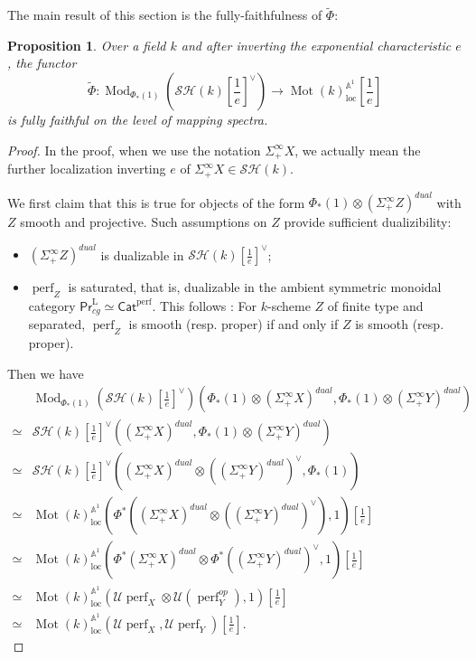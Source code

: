 \documentclass{article}
\newtheorem{prop}[thm]{Proposition}
\theoremstyle{definition}
\newcommand{\on}{\operatorname}
\newcommand{\PrL}{\mathsf{Pr}^\mathrm{L} }
\begin{document}
The main result of this section is the fully-faithfulness of $\widetilde{\Phi}$:
\begin{prop}\label{comparison.SH}
Over a field $k$ and after inverting the exponential characteristic $e$, the functor\[
\widetilde{\Phi}:\on{Mod}_{\Phi_\ast(1)}(\mathcal{SH}(k)[\frac{1}{e}]^\vee)\rightarrow\on{Mot}(k)^{\mathbb{A}^1}_{\on{loc}}[\frac{1}{e}]
\]
is fully faithful on the level of mapping spectra.
\end{prop}
\begin{proof}
In the proof, when we use the notation $\Sigma^\infty_+X$, we actually mean the further localization inverting $e$ of $\Sigma^\infty_+X\in\mathcal{SH}(k)$.


We first claim that this is true for objects of the form $\Phi_\ast(1)\otimes(\Sigma^\infty_+ Z)^{dual}$ with $Z$ smooth and projective. Such assumptions on $Z$ provide sufficient dualizibility:
\begin{itemize}
\item $(\Sigma^\infty_+ Z)^{dual}$ is dualizable in $\mathcal{SH}(k)[\frac{1}{e}]^\vee$;
\item $\on{perf}_Z$ is saturated, that is, dualizable in the ambient symmetric monoidal category $\PrL_{cg}\simeq\mathsf{Cat}^{\on{perf}}$. This follows \cite[Proposition 3.31]{Orl}: For $k$-scheme $Z$ of finite type and separated, $\on{perf}_Z$ is smooth (resp. proper) if and only if $Z$ is smooth (resp. proper).
\end{itemize}
Then we have\[\begin{aligned}
&\on{Mod}_{\Phi_\ast(1)}(\mathcal{SH}(k)[\frac{1}{e}]^{\vee})(\Phi_\ast(1)\otimes(\Sigma^\infty_+ X)^{dual},\Phi_\ast(1)\otimes(\Sigma^\infty_+ Y)^{dual})\\
\simeq&\mathcal{SH}(k)[\frac{1}{e}]^{\vee}((\Sigma^\infty_+ X)^{dual},\Phi_\ast(1)\otimes(\Sigma^\infty_+ Y)^{dual})\\
\simeq&\mathcal{SH}(k)[\frac{1}{e}]^{\vee}((\Sigma^\infty_+ X)^{dual}\otimes((\Sigma^\infty_+ Y)^{dual})^\vee,\Phi_\ast(1))\\
\simeq&\on{Mot}(k)^{\mathbb{A}^1}_{\on{loc}}(\Phi^\ast((\Sigma^\infty_+ X)^{dual}\otimes((\Sigma^\infty_+ Y)^{dual})^\vee),1)[\frac{1}{e}]\\
\simeq&\on{Mot}(k)^{\mathbb{A}^1}_{\on{loc}}(\Phi^\ast(\Sigma^\infty_+ X)^{dual}\otimes\Phi^\ast((\Sigma^\infty_+ Y)^{dual})^\vee,1)[\frac{1}{e}]\\
\simeq&\on{Mot}(k)^{\mathbb{A}^1}_{\on{loc}}(\mathcal{U}\on{perf}_X\otimes\mathcal{U}(\on{perf}_Y^{op}),1)[\frac{1}{e}]\\
\simeq&\on{Mot}(k)^{\mathbb{A}^1}_{\on{loc}}(\mathcal{U}\on{perf}_X,\mathcal{U}\on{perf}_Y)[\frac{1}{e}].
\end{aligned}\]



\end{proof}
\end{document}
